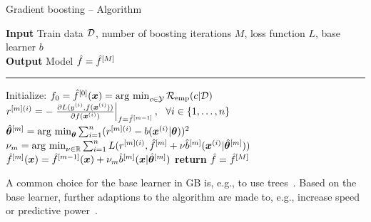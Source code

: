 \documentclass[t,10pt]{beamer}
\begin{document}
\begin{frame}{Gradient boosting -- Algorithm}
  \begin{algorithm}[H]
  \footnotesize
  \caption{GB algorithm}\label{algo:gb}
  \hspace*{\algorithmicindent} \textbf{Input} Train data $\mathcal{D}$, number of boosting iterations $M$, loss function $L$, base learner $b$\\
  \hspace*{\algorithmicindent} \textbf{Output} Model $\hat{f} = \hat{f}^{[M]}$\vspace{0.1cm}
  \hrule
  \begin{algorithmic}[1]
      \State Initialize: $f_0 = \hat{f}^{[0]}(\bm{x}) = \operatorname{arg~min}_{c\in\mathcal{Y}}\mathcal{R}_{\text{emp}}(c|\mathcal{D})$
          \State $r^{[m](i)} = -\left.\frac{\partial L(y^{(i)}, f(\bm{x}^{(i)}))}{\partial f(\bm{x}^{(i)})}\right|_{f = \hat{f}^{[m-1]}},\ \ \forall i \in \{1, \dots, n\}$
          \State $\hat{\bm{\theta}}^{[m]} = \operatorname{arg~min}_{\bm{\theta}} \sum_{i=1}^n(r^{[m](i)} - b(\bm{x}^{(i)} | \bm{\theta}))^2$
          \State $\nu_m = \operatorname{arg~min}_{\nu\in\mathbb{R}} \sum_{i=1}^n L(r^{[m](i)}, \hat{f}^{[m]} + \nu \hat{b}^{[m]}(\bm{x}^{(i)} | \hat{\bm{\theta}}^{[m]}))$
          \State $\hat{f}^{[m]}(\bm{x}) = \hat{f}^{[m-1]}(\bm{x}) + \nu_m \hat{b}^{[m]}(\bm{x} | \hat{\bm{\theta}}^{[m]})$
      \EndWhile
      \State \textbf{return} $\hat{f} = \hat{f}^{[M]}$
  \EndProcedure
  \end{algorithmic}
  \end{algorithm}
  \vspace{-0.5cm}
  A common choice for the base learner in GB is, e.g., to use trees~\citep{friedman2001greedy}. Based on the base learner, further adaptions to the algorithm are made to, e.g., increase speed or predictive power~\citep{chen2015xgboost}.
\end{frame}
\end{document}
